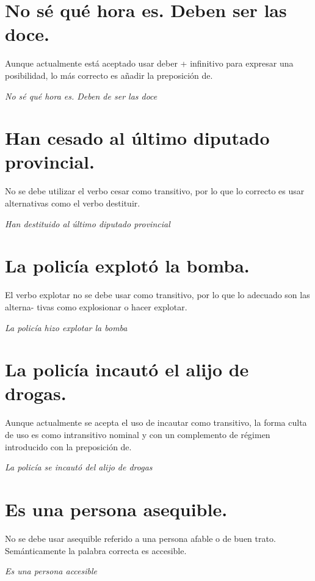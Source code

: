 \documentclass[12pt, a4paper, oneside]{report}
\begin{document}
        \section{No sé qué hora es. \color{rojo}Deben\color{negro} \;ser las doce.}
        Aunque actualmente está aceptado usar deber + infinitivo para expresar una posibilidad,
lo más correcto es añadir la preposición de.
        \begin{center}
            \textit{No sé qué hora es. \color{verde}Deben de\color{negro} \;ser las doce}
        \end{center}

        \section{Han \color{rojo}cesado\color{negro} \;al último diputado provincial.}
        No se debe utilizar el verbo cesar como transitivo, por lo que lo correcto es usar alternativas
como el verbo destituir.
        \begin{center}
            \textit{Han \color{verde}destituido\color{negro} \;al último diputado provincial}
        \end{center}
        \clearpage

        \section{La policía \color{rojo}explotó\color{negro} \;la bomba.}
        El verbo explotar no se debe usar como transitivo, por lo que lo adecuado son las alterna-
tivas como explosionar o hacer explotar.
        \begin{center}
            \textit{La policía \color{verde}hizo explotar\color{negro} \;la bomba}
        \end{center}

        \section{La policía \color{rojo}incautó\color{negro} \;el alijo de drogas.}
        Aunque actualmente se acepta el uso de incautar como transitivo, la forma culta de uso
es como intransitivo nominal y con un complemento de régimen introducido con la preposición
de.
        \begin{center}
            \textit{La policía \color{verde}se incautó del\color{negro} \;alijo de drogas}
        \end{center}

        \section{Es una persona \color{rojo}asequible\color{negro}.}
        No se debe usar asequible referido a una persona afable o de buen trato. Semánticamente
la palabra correcta es accesible.
        \begin{center}
            \textit{Es una persona \color{verde}accesible\color{negro}}
        \end{center}
\end{document}
